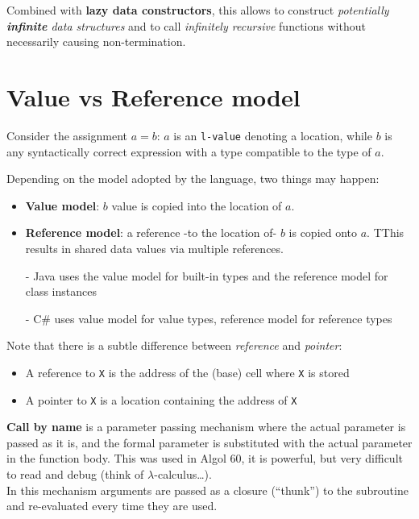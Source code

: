 Combined with \textbf{lazy data constructors}, this allows to
construct \textit{potentially \textbf{infinite} data structures} and to call
\textit{infinitely recursive} functions without necessarily causing non-termination.

\section{Value vs Reference model}
Consider the assignment $a = b$:
$a$ is an \texttt{l-value} denoting a location, while $b$ is any syntactically correct expression with a type compatible to the type of $a$.
{Depending on the model adopted by the language, two things may happen:\ns
\begin{itemize}
   \item \textbf{Value model}: $b$ value is copied into the location of $a$.
   \item \textbf{Reference model}: a reference -to the location of- $b$ is copied onto $a$. TThis results in shared data values via multiple references.
   \item[-] Java uses the value model for built-in types and the reference model for class instances
   \item[-] C\# uses value model for value types, reference model for reference types
\end{itemize}}

{Note that there is a subtle difference between \textit{reference} and \textit{pointer}:\ns
\begin{itemize}
	\item A reference to \texttt{X} is the address of the (base) cell where \texttt{X} is stored
	\item A pointer to \texttt{X} is a location containing the address of \texttt{X}
\end{itemize}}
\nl

\textbf{Call by name} is a parameter passing mechanism where the actual parameter is passed as it is, and the formal parameter is substituted with the actual parameter in the function body.
This was used in Algol 60, it is powerful, but very difficult to read and debug (think of $\lambda$-calculus\dots).\\
In this mechanism arguments are passed as a closure (``thunk'') to the subroutine and re-evaluated every time they are used.

